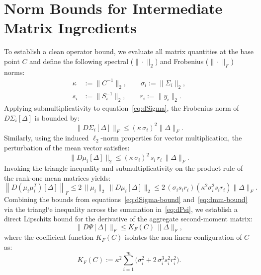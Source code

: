 \documentclass[11pt,a4paper]{article}
\begin{document}
\section{Norm Bounds for Intermediate Matrix Ingredients}
To establish a clean operator bound, we evaluate all matrix quantities at the base point $C$ and define the following spectral ($\|\cdot\|_2$) and Frobenius ($\|\cdot\|_F$) norms:
\begin{align*}
\kappa &:= \|C^{-1}\|_2, \qquad \sigma_i := \|\Sigma_i\|_2, \\
s_i    &:= \|S_i^{-1}\|_2, \qquad r_i := \|y_i\|_2.
\end{align*}
Applying submultiplicativity to equation~\eqref{eq:dSigma}, the Frobenius norm of $D\Sigma_i[\Delta]$ is bounded by:
\begin{equation}\label{eq:dSigma-bound}
\|D\Sigma_i[\Delta]\|_F \le (\kappa\,\sigma_i)^2 \|\Delta\|_F.
\end{equation}
Similarly, using the induced $\ell_2$-norm properties for vector multiplication, the perturbation of the mean vector satisfies:
\begin{equation}\label{eq:dmu-bound}
\|D\mu_i[\Delta]\|_2 \le (\kappa\,\sigma_i)^2\, s_i\,r_i\,\|\Delta\|_F.
\end{equation}
Invoking the triangle inequality and submultiplicativity on the product rule of the rank-one mean matrices yields:
\begin{equation}\label{eq:dmm-bound}
\left\|D(\mu_i\mu_i^T)[\Delta]\right\|_F \le 2\,\|\mu_i\|_2\,\|D\mu_i[\Delta]\|_2 \le 2\, (\sigma_i s_i r_i)\left(\kappa^2\sigma_i^2 s_i r_i\right)\|\Delta\|_F.
\end{equation}
Combining the bounds from equations~\eqref{eq:dSigma-bound} and~\eqref{eq:dmm-bound} via the triangl`e inequality across the summation in~\eqref{eq:dPsi}, we establish a direct Lipschitz bound for the derivative of the aggregate second-moment matrix:
\begin{equation}\label{eq:Kf-def}
\|D\Psi[\Delta]\|_F \le K_F(C)\,\|\Delta\|_F,
\end{equation}
where the coefficient function $K_F(C)$ isolates the non-linear configuration of $C$ as:
\begin{equation}
K_F(C) := \kappa^2 \sum_{i=1}^m \Big( \sigma_i^2 + 2\,\sigma_i^3 s_i^2 r_i^2 \Big).
\end{equation}
\end{document}
